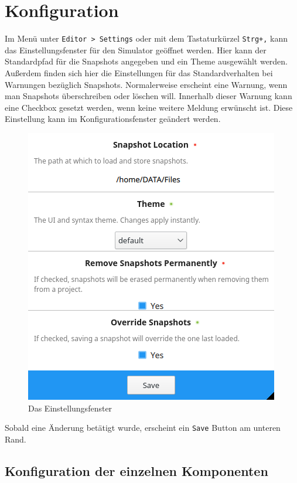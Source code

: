 
\section{Konfiguration}
\label{user-manual-configuration}

Im Menü unter \texttt{Editor > Settings} oder mit dem Tastaturkürzel
\texttt{Strg+,} kann das Einstellungsfenster für den Simulator geöffnet werden.
Hier kann der Standardpfad für die Snapshots angegeben und ein Theme
ausgewählt werden.\\
Außerdem finden sich hier die Einstellungen für das
Standardverhalten bei Warnungen bezüglich Snapshots. Normalerweise erscheint
eine Warnung, wenn man Snapshots überschreiben oder löschen will.  Innerhalb
dieser Warnung kann eine Checkbox gesetzt werden, wenn keine weitere Meldung erwünscht
ist. Diese Einstellung kann im Konfigurationsfenster geändert werden.


\begin{figure}[ht]
	\centering
  \includegraphics[scale=0.9]{Images/Settings}
	\caption{Das Einstellungsfenster}
	\label{Settings}
\end{figure}


Sobald eine Änderung betätigt wurde, erscheint ein \texttt{Save} Button am unteren Rand.


\subsection{Konfiguration der einzelnen Komponenten}

